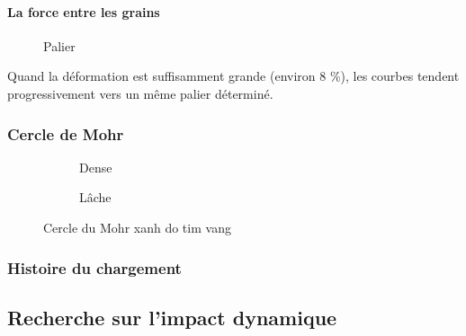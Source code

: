 \documentclass[a4paper,12pt]{report}
\begin{document}
\paragraph{La force entre les grains}
\begin{figure}[h!]
    \centering
  \caption{Palier}
    \label{fig:Palier}
\end{figure}
Quand la déformation est suffisamment grande (environ 8 \%), les courbes tendent progressivement vers un même palier déterminé.

\subsubsection{Cercle de Mohr}
\begin{figure}[h!]
    \centering
    \begin{subfigure}[b]{0.48\textwidth}
        \centering
        \scalebox{0.6}{\small }
        \caption{Dense}
        \label{fig:palier_a}
    \end{subfigure}
    \hfill
    \begin{subfigure}[b]{0.48\textwidth}
        \centering
        \scalebox{0.7}{\small }
        \caption{Lâche}
        \label{fig:palier_b}
    \end{subfigure}
    \caption{Cercle du Mohr xanh do tim vang}
    \label{fig:CercleDuMohr}
\end{figure}
\subsubsection{Histoire du chargement}

\subsection{Recherche sur l'impact dynamique}
\end{document}
